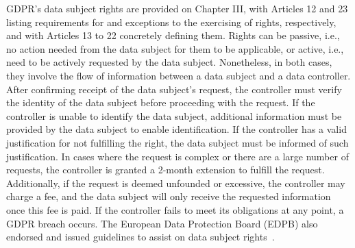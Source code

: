 \documentclass{IOS-Book-Article}     %
\begin{document}
GDPR's data subject rights are provided on Chapter III, with Articles 12 and 23 listing requirements for and exceptions to the exercising of rights, respectively, and with Articles 13 to 22 concretely defining them.
Rights can be passive, i.e., no action needed from the data subject for them to be applicable, or active, i.e., need to be actively requested by the data subject.
Nonetheless, in both cases, they involve the flow of information between a data subject and a data controller.
After confirming receipt of the data subject's request, the controller must verify the identity of the data subject before proceeding with the request. 
If the controller is unable to identify the data subject, additional information must be provided by the data subject to enable identification.
If the controller has a valid justification for not fulfilling the right, the data subject must be informed of such justification.
In cases where the request is complex or there are a large number of requests, the controller is granted a 2-month extension to fulfill the request.
Additionally, if the request is deemed unfounded or excessive, the controller may charge a fee, and the data subject will only receive the requested information once this fee is paid.
If the controller fails to meet its obligations at any point, a GDPR breach occurs.
The European Data Protection Board (EDPB) also endorsed and issued guidelines to assist on data subject rights~\cite{european_data_protection_board_guidelines_2023,article_29_data_protection_working_party_guidelines_2017,sis_ii_supervision_coordination_group_schengen_2023}.
\end{document}
